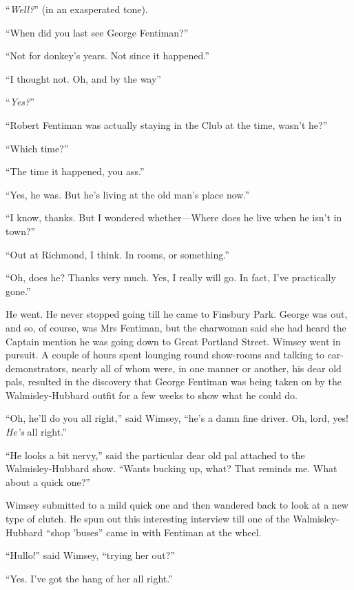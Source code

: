 \enquote{\textit{Well?}} (in an exasperated tone).

\enquote{When did you last see George Fentiman?}

\enquote{Not for donkey's years. Not since it happened.}

\enquote{I thought not. Oh, and by the way\longdash}

\enquote{\textit{Yes?}}

\enquote{Robert Fentiman was actually staying in the Club at the time, wasn't he?}

\enquote{Which time?}

\enquote{The time it happened, you ass.}

\enquote{Yes, he was. But he's living at the old man's place now.}

\enquote{I know, thanks. But I wondered whether\allowbreak---\allowbreak Where does he live when he isn't in town?}

\enquote{Out at Richmond, I think. In rooms, or something.}

\enquote{Oh, does he? Thanks very much. Yes, I really will go. In fact, I've practically gone.}

He went. He never stopped going till he came to Finsbury Park. George was out, and so, of course, was Mrs Fentiman, but the charwoman said she had heard the Captain mention he was going down to Great Portland Street. Wimsey went in pursuit. A couple of hours spent lounging round show-rooms and talking to car-demonstrators, nearly all of whom were, in one manner or another, his dear old pals, resulted in the discovery that George Fentiman was being taken on by the Walmisley-Hubbard outfit for a few weeks to show what he could do.

\enquote{Oh, he'll do you all right,} said Wimsey, \enquote{he's a damn fine driver. Oh, lord, yes! \textit{He's} all right.}

\enquote{He looks a bit nervy,} said the particular dear old pal attached to the Walmisley-Hubbard show. \enquote{Wants bucking up, what? That reminds me. What about a quick one?}

Wimsey submitted to a mild quick one and then wandered back to look at a new type of clutch. He spun out this interesting interview till one of the Walmisley-Hubbard \enquote{shop 'buses} came in with Fentiman at the wheel.

\enquote{Hullo!} said Wimsey, \enquote{trying her out?}

\enquote{Yes. I've got the hang of her all right.}

